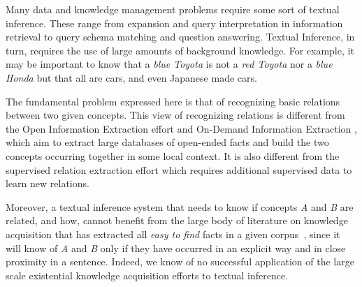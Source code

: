 
\newcommand{\ignore}[1]{}







Many data and knowledge management problems require some sort of
textual inference. These range from expansion and query interpretation
in information retrieval to query schema matching and question
answering. Textual Inference, in turn, requires the use of large
amounts of background knowledge. For example, it may be important to
know that a {\em blue Toyota} is not a {\em red Toyota} nor a {\em
  blue Honda} but that all are cars, and even Japanese made cars.

The fundamental problem expressed here is that of recognizing basic
relations between two given concepts. This view of recognizing
relations is different from the Open Information Extraction effort
\cite{BCSBE07} and On-Demand Information Extraction \cite{Sekine06},
which aim to extract large databases of open-ended facts and build the
two concepts occurring together in some local context. It is also
different from the supervised relation extraction\cite{RothYi04}
effort which requires additional supervised data to learn new
relations.

\ignore{ This is a different problem than variations of
relation extraction studied in the literature
\cite{banko-etzioni:2008:ACLMain} that aim at extracting
relations between entities that co-occur in a given snippet of
text. While the extraction of knowledge of this sort has also
been discussed in the literature, it has been studied mostly in
the context of large scale knowledge acquisition - extract all
{\em easy to find} facts in a given
corpus~\cite{banko-etzioni:2008:ACLMain,davidov-rappoport:2008:ACLMain2,pacsca-vandurme:2008:ACLMain,bunescu-mooney:2007:ACLMain}.
This knowledge is typically existential; e.g., while it is true
that A is of type B, say, it is not clear if it is commonly B.
}

Moreover, a textual inference system that needs to know if
concepts {\em A} and {\em B} are related, and how, cannot benefit from the
large body of literature on knowledge acquisition that has
extracted all {\em easy to find} facts in a given
corpus~\cite{banko-etzioni:2008:ACLMain,davidov-rappoport:2008:ACLMain2,pacsca-vandurme:2008:ACLMain},
since it will know of {\em A} and {\em B} only if they have occurred
in an explicit way and in close proximity in a sentence. Indeed, we
know of no successful application of the large scale existential
knowledge acquisition efforts to textual inference.


